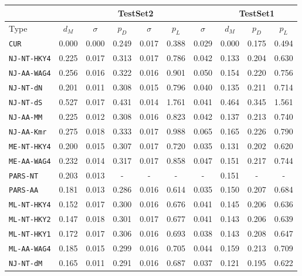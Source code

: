 \begin{table}[!hb]
\begin{center}
\begin{tabular}{|l|cc|cc|cc|ccc|}
\hline
                 &\multicolumn{6}{|c|}{\sf TestSet2}             &\multicolumn{3}{|c|}{\sf TestSet1}\\
\hline
Type             &$d_M$ &$\sigma$&$p_D$ &$\sigma$&$p_L$ &$\sigma$&$d_M$  &$p_D$  &$p_L$  \\
\hline
{\tt CUR}        & 0.000 & 0.000 & 0.249 & 0.017 & 0.388 & 0.029 & 0.000 & 0.175 & 0.494 \\
\hline                                                                                   
{\tt NJ-NT-HKY4} & 0.225 & 0.017 & 0.313 & 0.017 & 0.786 & 0.042 & 0.133 & 0.204 & 0.630 \\
{\tt NJ-AA-WAG4} & 0.256 & 0.016 & 0.322 & 0.016 & 0.901 & 0.050 & 0.154 & 0.220 & 0.756 \\
{\tt NJ-NT-dN}   & 0.201 & 0.011 & 0.308 & 0.015 & 0.796 & 0.040 & 0.135 & 0.211 & 0.714 \\
{\tt NJ-NT-dS}   & 0.527 & 0.017 & 0.431 & 0.014 & 1.761 & 0.041 & 0.464 & 0.345 & 1.561 \\
{\tt NJ-AA-MM}   & 0.225 & 0.012 & 0.308 & 0.016 & 0.823 & 0.042 & 0.137 & 0.213 & 0.740 \\
{\tt NJ-AA-Kmr}  & 0.275 & 0.018 & 0.333 & 0.017 & 0.988 & 0.065 & 0.165 & 0.226 & 0.790 \\
{\tt ME-NT-HKY4} & 0.200 & 0.015 & 0.307 & 0.017 & 0.720 & 0.035 & 0.131 & 0.202 & 0.620 \\
{\tt ME-AA-WAG4} & 0.232 & 0.014 & 0.317 & 0.017 & 0.858 & 0.047 & 0.151 & 0.217 & 0.744 \\
\hline
{\tt PARS-NT}    & 0.203 & 0.013 & -     & -     & -     & -     & 0.151 & -     & -     \\
{\tt PARS-AA}    & 0.181 & 0.013 & 0.286 & 0.016 & 0.614 & 0.035 & 0.150 & 0.207 & 0.684 \\
\hline
{\tt ML-NT-HKY4} & 0.152 & 0.017 & 0.300 & 0.016 & 0.676 & 0.041 & 0.145 & 0.206 & 0.636 \\
{\tt ML-NT-HKY2} & 0.147 & 0.018 & 0.301 & 0.017 & 0.677 & 0.041 & 0.143 & 0.206 & 0.639 \\
{\tt ML-NT-HKY1} & 0.172 & 0.017 & 0.306 & 0.016 & 0.693 & 0.038 & 0.143 & 0.208 & 0.647 \\
{\tt ML-AA-WAG4} & 0.185 & 0.015 & 0.299 & 0.016 & 0.705 & 0.044 & 0.159 & 0.213 & 0.709 \\
\hline
{\tt NJ-NT-dM}   & 0.165 & 0.011 & 0.291 & 0.016 & 0.687 & 0.037 & 0.121 & 0.195 & 0.622 \\

\end{tabular}
\end{center}
\end{table}
